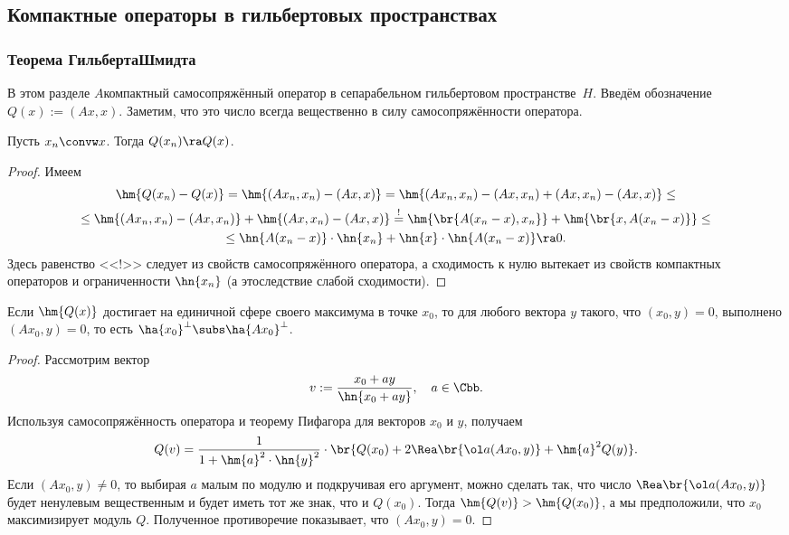 \documentclass[a4paper]{article}
\begin{document}
\subsection{Компактные операторы в гильбертовых пространствах}

\subsubsection{Теорема Гильберта\ч Шмидта}

В этом разделе $A$\т компактный самосопряжённый оператор в сепарабельном гильбертовом пространстве~$H$.
Введём обозначение $Q(x) := (Ax,x)$. Заметим, что это число всегда вещественно в силу самосопряжённости
оператора.

\begin{lemma}
Пусть $x_n \convw x$. Тогда $Q(x_n) \ra Q(x)$.
\end{lemma}
\begin{proof}
Имеем
\begin{multline*}
\hm{Q(x_n) - Q(x)} = \hm{(A x_n,x_n) - (Ax,x)} = \hm{(Ax_n, x_n) - (Ax,x_n) + (Ax, x_n) - (Ax,x)} \le\\ \le
\hm{(Ax_n, x_n) - (Ax, x_n)} + \hm{(Ax, x_n) - (Ax, x)} \stackrel{!}{=}
\hm{\br{A(x_n-x), x_n}} + \hm{\br{x, A(x_n-x)}} \le \\ \le \hn{A(x_n-x)}\cdot\hn{x_n} + \hn{x}\cdot\hn{A(x_n-x)} \ra 0.
\end{multline*}
Здесь равенство <<!>> следует из свойств самосопряжённого оператора, а сходимость к нулю вытекает из свойств
компактных операторов и ограниченности $\hn{x_n}$ (а это\т следствие слабой сходимости).
\end{proof}

\begin{lemma}
Если $\hm{Q(x)}$ достигает на единичной сфере своего максимума в точке $x_0$,
то для любого вектора $y$ такого, что $(x_0,y) = 0$, выполнено $(Ax_0, y) = 0$,
то есть $\ha{x_0}^\bot \subs \ha{Ax_0}^\bot$.
\end{lemma}
\begin{proof}
Рассмотрим вектор
$$v := \frac{x_0 + ay}{\hn{x_0 + ay}}, \quad a \in \Cbb.$$
Используя самосопряжённость оператора и теорему Пифагора для векторов $x_0$ и $y$, получаем
$$Q(v) = \frac{1}{1 + \hm{a}^2\cdot\hn{y}^2}\cdot\br{ Q(x_0) + 2\Rea\br{\ol a(Ax_0,y)} + \hm{a}^2Q(y)}.$$
Если $(Ax_0,y) \neq 0$, то выбирая $a$ малым по модулю и подкручивая его аргумент, можно сделать так,
что число $\Rea\br{\ol a(Ax_0,y)}$ будет ненулевым вещественным и будет иметь тот же знак, что и $Q(x_0)$.
Тогда $\hm{Q(v)} > \hm{Q(x_0)}$, а мы предположили, что $x_0$ максимизирует модуль $Q$. Полученное
противоречие показывает, что $(Ax_0,y) = 0$.
\end{proof}
\end{document}
